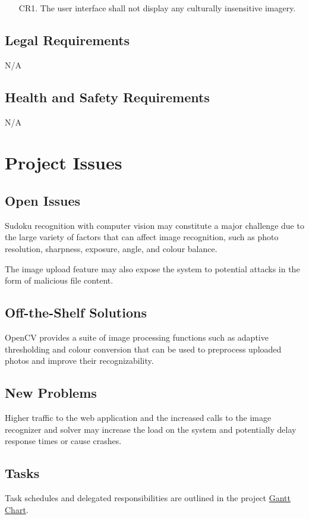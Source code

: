 \documentclass[11pt]{article}
\begin{document}
\begin{enumerate}
    \item [CR1.] The user interface shall not display any culturally insensitive imagery.
\end{enumerate}

\subsection{Legal Requirements}

N/A

\subsection{Health and Safety Requirements}

N/A

\section{Project Issues}

\subsection{Open Issues}
Sudoku recognition with computer vision may constitute a major challenge due to the large variety of factors that can affect image recognition, such as photo resolution, sharpness, exposure, angle, and colour balance. 

The image upload feature may also expose the system to potential attacks in the form of malicious file content.

\subsection{Off-the-Shelf Solutions}
OpenCV provides a suite of image processing functions such as adaptive thresholding and colour conversion that can be used to preprocess uploaded photos and improve their recognizability. 

\subsection{New Problems}
Higher traffic to the web application and the increased calls to the image recognizer and solver may increase the load on the system and potentially delay response times or cause crashes.

\subsection{Tasks}
Task schedules and delegated responsibilities are outlined in the project \href{https://gitlab.cas.mcmaster.ca/bhuiyr2/sudokusolver_l02_grp08/-/blob/main/ProjectSchedule/Gantt_Sudoku.pdf}{Gantt Chart}.
\end{document}
